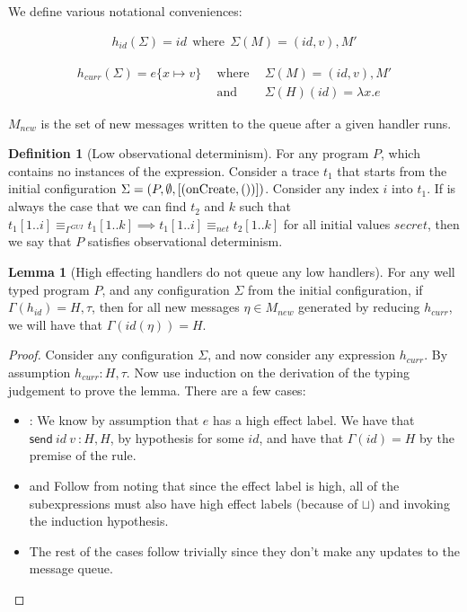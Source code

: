 \documentclass[conference]{IEEEtran}
\newcommand{\code}[1]{\text{\lstinline!#1!}}
\theoremstyle{definition}
\newtheorem{defn}{Definition}[section]
\newtheorem{lem}{Lemma}[section]
\newcommand{\aset}[1]{\{#1\}}
\newcommand{\sfmt}[1]{\textsf{#1}}
\newcommand{\ssend}[2]{\sfmt{send}~#1~#2}
\newcommand{\tr}{t}
\begin{document}
We define various notational conveniences: 

\begin{displaymath}
  \begin{array}{c}
    h_{id}(\Sigma) = id ~~ \text{where} ~~ \Sigma(M) = (id,v),M'
  \end{array}
\end{displaymath}

\begin{displaymath}
  \begin{array}{lll}
    h_{curr}(\Sigma) = e \aset{x \mapsto v} & ~~ \text{where} ~~ & \Sigma(M) = (id,v),M' \\
    & ~~\text{and}~~ & \Sigma(H)(id) = \lambda x . e
  \end{array}
\end{displaymath}

$M_{new}$ is the set of new messages written to the queue after a
given handler runs.

\begin{defn}[Low observational determinism]
  For any program $P$, which contains no instances of the
  \code{release} expression.  Consider a trace $\tr_1$ that starts
  from the initial configuration $\Sigma = (P, \emptyset,
  [(\code{onCreate},())])$.  Consider any index $i$ into $\tr_1$.  If
  is always the case that we can find $\tr_2$ and $k$ such that
  $\tr_1[1..i] \equiv_{\Gamma^{GUI}} \tr_1[1..k] \implies \tr_1[1..i]
  \equiv_{net} \tr_2[1..k]$ for all initial values $secret$, then we
  say that $P$ satisfies observational determinism.
\end{defn}

\begin{lem}[High effecting handlers do not queue any low handlers]
  For any well typed program $P$, and any configuration $\Sigma$ from
  the initial configuration, if $\Gamma(h_{id}) = H , \tau$, then for
  all new messages $\eta \in M_{new}$ generated by reducing
  $h_{curr}$, we will have that $\Gamma(id(\eta)) = H$.
\end{lem}

\begin{proof}
  Consider any configuration $\Sigma$, and now consider any expression
  $h_{curr}$.  By assumption $h_{curr} : H , \tau$.  Now use induction
  on the derivation of the typing judgement to prove the lemma.  There
  are a few cases:
  \begin{itemize}
  \item \code{ESend}: We know by assumption that $e$ has a high effect
    label.  We have that $\ssend{id~v} : H , H$, by hypothesis for
    some $id$, and have that $\Gamma(id) = H$ by the premise of the
    \code{ESend} rule.
  \item \code{EApp} and \code{EIf} Follow from noting that since the
    effect label is high, all of the subexpressions must also have
    high effect labels (because of $\sqcup$) and invoking the
    induction hypothesis.
  \item The rest of the cases follow trivially since they don't make
    any updates to the message queue.
  \end{itemize}
\end{proof}
\end{document}
